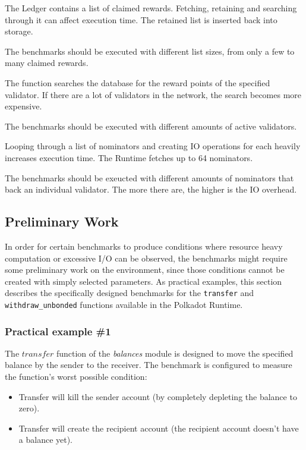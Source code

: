 \documentclass[11pt,a4paper]{article}
\newcommand{\SubItem}[1]{
    {\setlength\itemindent{15pt} \item[-] #1}
}
\begin{document}
\begin{itemize}
  \item The Ledger contains a list of claimed rewards. Fetching, retaining and searching through it can affect execution
  time. The retained list is inserted back into storage.
  \SubItem{The benchmarks should be executed with different list sizes, from only a few to many claimed rewards.}
  \item The function searches the database for the reward points of the specified validator. If there are a lot of validators
  in the network, the search becomes more expensive.
  \SubItem{The benchmarks should be executed with different amounts of active validators.}
  \item Looping through a list of nominators and creating IO operations for each heavily increases execution time.
  The Runtime fetches up to 64 nominators.
  \SubItem{The benchmarks should be exeucted with different amounts of nominators that back an individual validator.
  The more there are, the higher is the IO overhead.}
\end{itemize}

\subsection{Preliminary Work}\label{sect:preliminary-work}
In order for certain benchmarks to produce conditions where resource heavy computation or excessive
I/O can be observed, the benchmarks might require some preliminary work on the environment, since those
conditions cannot be created with simply selected parameters.
As practical examples, this section describes the specifically designed benchmarks for the \verb|transfer|
and \verb|withdraw_unbonded| functions available in the Polkadot Runtime.

\subsubsection{Practical example \#1}
The $transfer$ function of the \textit{balances} module is designed to move the specified balance by the sender to the receiver.
The benchmark is configured to measure the function's worst possible condition:

\begin{itemize}
  \item Transfer will kill the sender account (by completely depleting the balance to zero).
  \item Transfer will create the recipient account (the recipient account doesn't have a balance yet).
\end{itemize}
\end{document}
